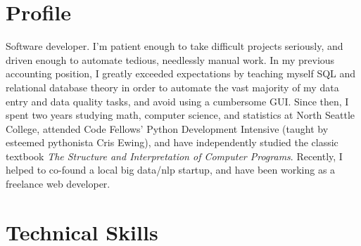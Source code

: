 \documentclass[10pt,a4paper,sans]{moderncv}        %
\begin{document}
\makecvtitle

\section{Profile}
Software developer. I'm patient enough to take difficult projects seriously, and
driven enough to automate tedious, needlessly manual work. In my previous
accounting position, I greatly exceeded expectations by teaching myself SQL and
relational database theory in order to automate the vast majority of my data
entry and data quality tasks, and avoid using a cumbersome GUI. Since then, I
spent two years studying math, computer science, and statistics at North Seattle
College, attended Code Fellows' Python Development Intensive (taught by esteemed
pythonista Cris Ewing), and have independently studied the classic textbook
\textit{The Structure and Interpretation of Computer Programs}. Recently, I
helped to co-found a local big data/nlp startup, and have been working as a
freelance web developer.

\section{Technical Skills}
\begin{cvcolumns}
\end{cvcolumns}

\begin{comment}
  \section{Technical Skills}
  \subsection{Proficient}
  Python, Django, Django REST Framework, Pyramid, Git, SQL, HTML/CSS,
  JavaScript/jQuery, Unix systems, Shell Scripting, Org-mode, Regular Expressions
  \subsection{Familiar}
  AWS Deployment, Heroku Deployment, Ansible, PostgreSQL, Nginx, Gunicorn, Scheme, Sed
\end{comment}
\end{document}
